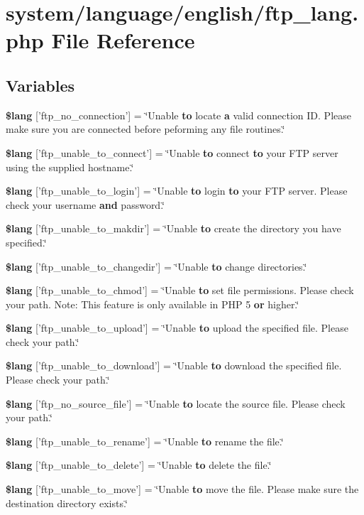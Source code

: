 \section{system/language/english/ftp\-\_\-lang.php File Reference}
\label{ftp__lang_8php}
\subsection*{Variables}
\begin{DoxyCompactItemize}
\item 
{\bf \$lang} ['ftp\-\_\-no\-\_\-connection'] = \char`\"{}Unable {\bf to} locate {\bf a} valid connection I\-D. Please make sure you are connected before peforming any file routines.\char`\"{}
\item 
{\bf \$lang} ['ftp\-\_\-unable\-\_\-to\-\_\-connect'] = \char`\"{}Unable {\bf to} connect {\bf to} your F\-T\-P server using the supplied hostname.\char`\"{}
\item 
{\bf \$lang} ['ftp\-\_\-unable\-\_\-to\-\_\-login'] = \char`\"{}Unable {\bf to} login {\bf to} your F\-T\-P server. Please check your username {\bf and} password.\char`\"{}
\item 
{\bf \$lang} ['ftp\-\_\-unable\-\_\-to\-\_\-makdir'] = \char`\"{}Unable {\bf to} create the directory you have specified.\char`\"{}
\item 
{\bf \$lang} ['ftp\-\_\-unable\-\_\-to\-\_\-changedir'] = \char`\"{}Unable {\bf to} change directories.\char`\"{}
\item 
{\bf \$lang} ['ftp\-\_\-unable\-\_\-to\-\_\-chmod'] = \char`\"{}Unable {\bf to} set file permissions. Please check your path. Note\-: This feature is only available in P\-H\-P 5 {\bf or} higher.\char`\"{}
\item 
{\bf \$lang} ['ftp\-\_\-unable\-\_\-to\-\_\-upload'] = \char`\"{}Unable {\bf to} upload the specified file. Please check your path.\char`\"{}
\item 
{\bf \$lang} ['ftp\-\_\-unable\-\_\-to\-\_\-download'] = \char`\"{}Unable {\bf to} download the specified file. Please check your path.\char`\"{}
\item 
{\bf \$lang} ['ftp\-\_\-no\-\_\-source\-\_\-file'] = \char`\"{}Unable {\bf to} locate the source file. Please check your path.\char`\"{}
\item 
{\bf \$lang} ['ftp\-\_\-unable\-\_\-to\-\_\-rename'] = \char`\"{}Unable {\bf to} rename the file.\char`\"{}
\item 
{\bf \$lang} ['ftp\-\_\-unable\-\_\-to\-\_\-delete'] = \char`\"{}Unable {\bf to} delete the file.\char`\"{}
\item 
{\bf \$lang} ['ftp\-\_\-unable\-\_\-to\-\_\-move'] = \char`\"{}Unable {\bf to} move the file. Please make sure the destination directory exists.\char`\"{}
\end{DoxyCompactItemize}


